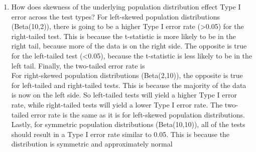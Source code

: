 \documentclass{article}\usepackage[]{graphicx}\usepackage[]{xcolor}
\begin{document}
\begin{enumerate}
\begin{enumerate}
    \item How does skewness of the underlying population distribution effect
    Type I error across the test types?
For left-skewed population distributions (Beta(10,2)), there is going to be a higher Type I error rate (\textgreater 0.05) for the right-tailed test. This is because the t-statistic is more likely to be in the right tail, because more of the data is on the right side. The opposite is true for the left-tailed test (\textless 0.05), because the t-statistic is less likely to be in the left tail. Finally, the two-tailed error rate is 
\\
For right-skewed population distributions (Beta(2,10)), the opposite is true for left-tailed and right-tailed tests. This is because the majority of the data is now on the left side. So left-tailed tests will yield a higher Type I error rate, while right-tailed tests will yield a lower Type I error rate. The two-tailed error rate is the same as it is for left-skewed population distributions.
\\
Lastly, for symmetric population distributions (Beta(10,10)), all of the tests should result in a Type I error rate similar to 0.05. This is because the distribution is symmetric and approximately normal
  \end{enumerate}
\end{enumerate}

\end{document}
